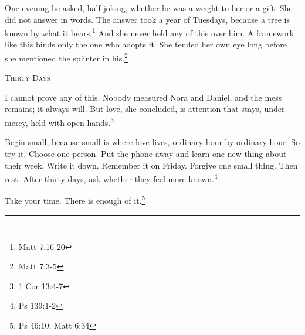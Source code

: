 \documentclass[10.5pt]{article}
\newcommand{\diamondrule}{%
  \begin{center}
    \vspace{-0.5em}
    \rule{0.25\textwidth}{0.4pt}\hspace{0.5em}\raisebox{-0.2ex}{\small$\blacklozenge$}\hspace{0.5em}\rule{0.25\textwidth}{0.4pt}
    \vspace{-0.5em}
  \end{center}
}
\begin{document}
One evening he asked, half joking, whether he was a weight to her or a gift. She did not answer in words. The answer took a year of Tuesdays, because a tree is known by what it bears.\footnote{Matt 7:16-20} And she never held any of this over him. A framework like this binds only the one who adopts it. She tended her own eye long before she mentioned the splinter in his.\footnote{Matt 7:3-5}

\vspace{1.5em}

\begin{center}
    {\scshape\large Thirty Days}\par
    \vspace{0.8em}
\end{center}

I cannot prove any of this. Nobody measured Nora and Daniel, and the mess remains; it always will. But love, she concluded, is attention that stays, under mercy, held with open hands.\footnote{1 Cor 13:4-7}

Begin small, because small is where love lives, ordinary hour by ordinary hour. So try it. Choose one person. Put the phone away and learn one new thing about their week. Write it down. Remember it on Friday. Forgive one small thing. Then rest. After thirty days, ask whether they feel more known.\footnote{Ps 139:1-2}

Take your time. There is enough of it.\footnote{Ps 46:10; Matt 6:34}

\vspace{1.5em}
\diamondrule
\end{document}
